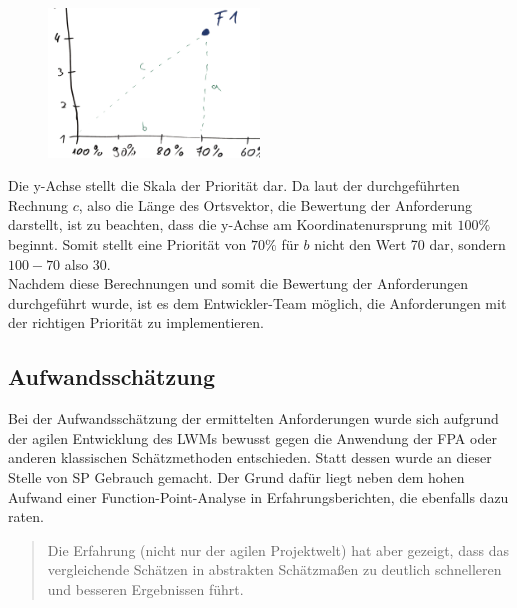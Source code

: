 \begin{figure}[!htb]
\centering 
		\includegraphics[width=0.5\textwidth]{images/100minusp.pdf}
  \label{fig:erklärung100-p}
\end{figure}

Die y-Achse stellt die Skala der Priorität dar. Da laut der durchgeführten Rechnung $c$, also die Länge des Ortsvektor, die Bewertung der Anforderung darstellt, ist zu beachten, dass die y-Achse am Koordinatenursprung mit $100\%$ beginnt. Somit stellt eine Priorität von $70\%$ für $b$ nicht den Wert 70 dar, sondern $100-70$ also $30$.\\[1em]

Nachdem diese Berechnungen und somit die Bewertung der Anforderungen durchgeführt wurde, ist es dem Entwickler-Team möglich, die Anforderungen mit der richtigen Priorität zu implementieren.


\subsection{Aufwandsschätzung}
\label{subsec:aufwandsschätzung}

Bei der Aufwandsschätzung der ermittelten Anforderungen wurde sich aufgrund der agilen Entwicklung des \ac{LWM}s bewusst gegen die Anwendung der \ac{FPA} oder anderen klassischen Schätzmethoden entschieden. Statt dessen wurde an dieser Stelle von \ac{SP} Gebrauch gemacht. Der Grund dafür liegt neben dem hohen Aufwand einer Function-Point-Analyse in Erfahrungsberichten, die ebenfalls dazu raten.

\begin{quote}
\glqq Die Erfahrung (nicht nur der agilen Projektwelt) hat aber gezeigt, dass das vergleichende Schätzen in abstrakten Schätzmaßen zu deutlich schnelleren und besseren Ergebnissen führt.\grqq    \citep{AGIL1}
\end{quote}

